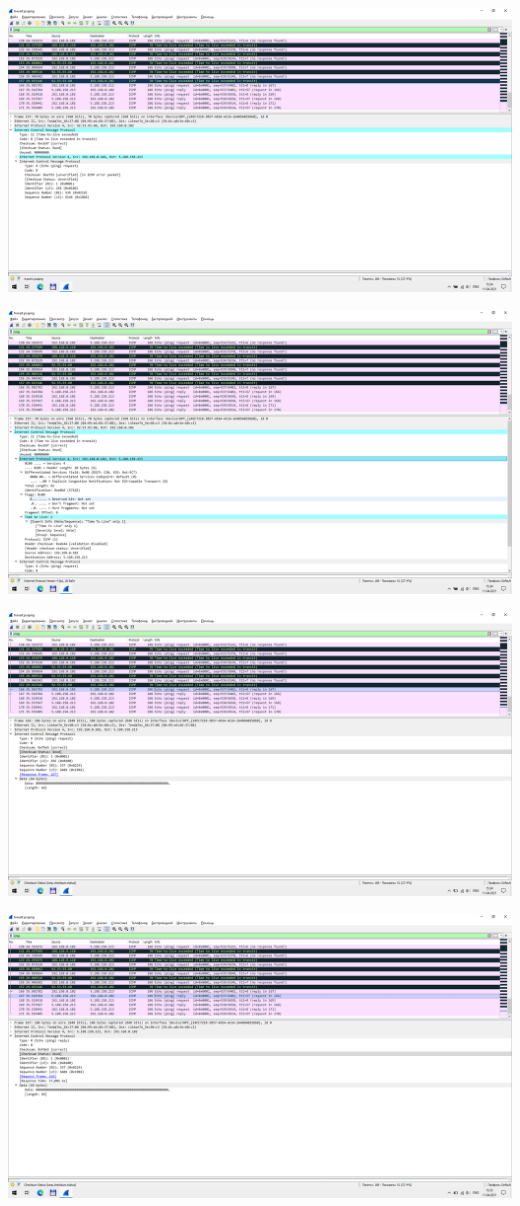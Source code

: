 \includegraphics[width=\textwidth]{screenshots/tracert_ttl_response_1}

\includegraphics[width=\textwidth]{screenshots/tracert_ttl_response_2}

\includegraphics[width=\textwidth]{screenshots/tracert_success_request_1}

\includegraphics[width=\textwidth]{screenshots/tracert_success_response_1}
